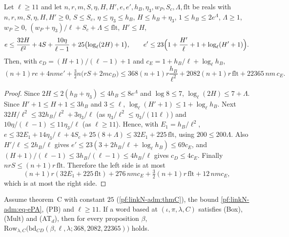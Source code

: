 \begin{lemma}\label{pf:linkN-adm:numAT}
Let $\ell\ge11$ and let $n,r,m,S,\eta,H,H',e,e',h_B,\eta_3,w_P,S_c,\Lambda,\mathrm{flt}$ be reals with $n,r,m,S,\eta,H,H'\ge0$,
$S\le S_c$, $\eta\le\eta_3\le h_B$, $H\le h_B+\eta_3$, $1\le h_B\le2e^\Lambda$, $\Lambda\ge1$, $w_P\ge0$,
$(w_P+\eta_3)/\ell+S_c+\Lambda\le\mathrm{flt}$, $H'\le H$,
\[
e\le\frac{32H}{\ell^2}+4S+\frac{10\eta}{\ell-1}+25\bigl(\log_\ell(2H)+1\bigr),\qquad
e'\le23\Bigl(1+\frac{H'}{\ell}+1+\log_\ell(H'+1)\Bigr).
\]
Then, with $c_D=(H+1)/(\ell-1)+1$ and $c_E=1+h_B/\ell+\log_\ell h_B$,
\[
(n+1)re+4nme'+\tfrac32n\bigl(rS+2mc_D\bigr)\le368(n+1)r\frac{h_B}{\ell^2}+2082(n+1)r\,\mathrm{flt}+22365\,nm\,c_E.
\]
\end{lemma}

\begin{proof}
Since $2H\le2(h_B+\eta_3)\le4h_B\le8e^\Lambda$ and $\log8\le7$, $\log_\ell(2H)\le7+\Lambda$. Since $H'+1\le H+1\le3h_B$ and
$3\le\ell$, $\log_\ell(H'+1)\le1+\log_\ell h_B$. Next $32H/\ell^2\le32h_B/\ell^2+3\eta_3/\ell$ (as $\eta_3/\ell^2\le
\eta_3/(11\ell)$) and $10\eta/(\ell-1)\le11\eta_3/\ell$ (as $\ell\ge11$). Hence, with $E_1=h_B/\ell^2$,
$e\le32E_1+14\eta_3/\ell+4S_c+25(8+\Lambda)\le32E_1+225\,\mathrm{flt}$, using $200\le200\Lambda$. Also $H'/\ell\le2h_B/\ell$
gives $e'\le23(3+2h_B/\ell+\log_\ell h_B)\le69c_E$, and $(H+1)/(\ell-1)\le3h_B/(\ell-1)\le4h_B/\ell$ gives $c_D\le4c_E$.
Finally $nrS\le(n+1)r\,\mathrm{flt}$. Therefore the left side is at most
\[
(n+1)r(32E_1+225\,\mathrm{flt})+276\,nmc_E+\tfrac32(n+1)r\,\mathrm{flt}+12\,nmc_E,
\]
which is at most the right side.
\end{proof}

\begin{proposition}\label{pf:linkN-adm:rowAT}
Assume theorem~C with constant $25$ (\cref{pf:linkN-adm:thmC}), the bound \eqref{pf:linkN-adm:eq-ePA},
(PB) and $\ell\ge11$. If a word based at $(\iota,\pi,\lambda,C)$ satisfies
(Box), (Mult) and (AT$_d$), then for every proposition $\beta$,
$\mathrm{Row}_{\lambda,C}\bigl(\mathrm{bd}_{CD}(\beta,\ell,\lambda;368,2082,22365)\bigr)$ holds.
\end{proposition}

